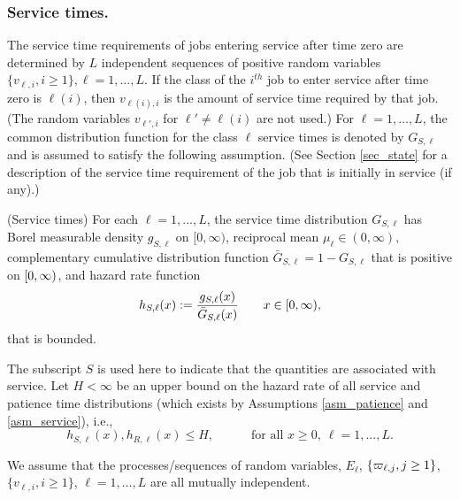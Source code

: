 \documentclass{article}
\numberwithin{equation}{section}
\begin{document}
\subsubsection*{Service times.}
The service time requirements of jobs entering service after time zero are determined by $L$ independent sequences of positive random variables  $\{v_{\ell,i},i\geq1\}, \ell=1,...,L.$ 
If the class of the $i^{th}$ job to enter service after time zero is $\ell(i)$, then $v_{\ell(i), i}$ is the amount of service time required by that job. (The random variables 
$v_{\ell', i}$ for $\ell'\not=\ell(i)$ are not used.) For $\ell =1, \ldots, L$, 
the common distribution function for the class $\ell$ service times is denoted by $G_{S,\ell}$ and is assumed to satisfy the following assumption. 
(See Section \ref{sec_state} for a description of the service time requirement of the job that is initially in service (if any).)

\begin{assumption}\label{asm_service}
  (Service times) For each $\ell=1,...,L$, the service time distribution $G_{S,\ell}$ has Borel measurable density $g_{S,\ell}$ on $[0,\infty)$, reciprocal mean $\mu_{\ell}\in(0,\infty),$ complementary cumulative distribution function $\bar G_{S,\ell}=1-G_{S,\ell}$ that is positive on $[0,\infty)$, and hazard rate function 
\[
h_{S,\ell}(x):=\frac{g_{S,\ell}(x)}{\bar G_{S,\ell}(x)}\quad\quad x\in[0,\infty),
\]
that is bounded.
\end{assumption}
The subscript $S$ is used here to indicate that the quantities are associated with service. Let $H<\infty$ be an upper bound on the hazard rate of all service and patience time distributions (which exists by Assumptions \ref{asm_patience} and \ref{asm_service}), i.e.,
\begin{equation}\label{def-H}
h_{S,\ell}(x),h_{R,\ell}(x)\leq H,  \quad\quad\quad \text{for all }x\geq0,\ \ell=1,...,L.
\end{equation}

We assume that the processes/sequences of random variables,  $E_\ell$, $\{ \varpi_{\ell, j}, j\geq 1\}$, $\{v_{\ell, i} , i\geq 1\}$, $\ell =1, \ldots, L$ are all mutually independent.
\end{document}
